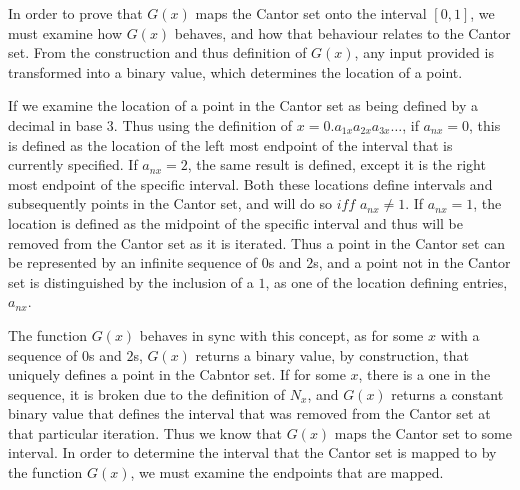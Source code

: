 		\item In order to prove that $G(x)$ maps the Cantor set onto the interval $[0,1]$, we must examine how $G(x)$ behaves, and how that behaviour relates to the Cantor set. From the construction and thus definition of $G(x)$, any input provided is transformed into a binary value, which determines the location of a point.

		\bigbreak

		If we examine the location of a point in the Cantor set as being defined by a decimal in base 3. Thus using the definition of $x = 0.a_{1x}a_{2x}a_{3x}\dots$, if $a_{nx} = 0$, this is defined as the location of the left most endpoint of the interval that is currently specified. If $a_{nx} = 2$, the same result is defined, except it is the right most endpoint of the specific interval. Both these locations define intervals and subsequently points in the Cantor set, and will do so $iff$ $a_{nx} \neq 1$. If $a_{nx} = 1$, the location is defined as the midpoint of the specific interval and thus will be removed from the Cantor set as it is iterated. Thus a point in the Cantor set can be represented by an infinite sequence of $0$s and $2$s, and a point not in the Cantor set is distinguished by the inclusion of a $1$, as one of the location defining entries, $a_{nx}$.

		\bigbreak

		The function $G(x)$ behaves in sync with this concept, as for some $x$ with a sequence of $0$s and $2$s, $G(x)$ returns a binary value, by construction, that uniquely defines a point in the Cabntor set. If for some $x$, there is a one in the sequence, it is broken due to the definition of $N_x$, and $G(x)$ returns a constant binary value that defines the interval that was removed from the Cantor set at that particular iteration. Thus we know that $G(x)$ maps the Cantor set to some interval. In order to determine the interval that the Cantor set is mapped to by the function $G(x)$, we must examine the endpoints that are mapped.